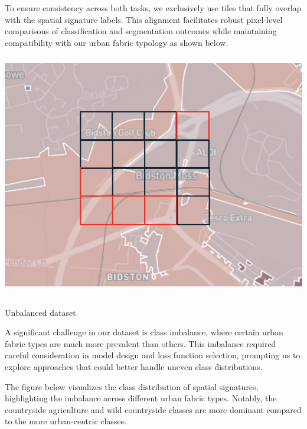 \documentclass[
  letterpaper,
  DIV=11,
  numbers=noendperiod]{scrartcl}
\makeatletter
\let\oldparagraph\paragraph
\renewcommand{\paragraph}{
    \@ifstar
      \xxxParagraphStar
      \xxxParagraphNoStar
  }
\newcommand{\xxxParagraphStar}[1]{\oldparagraph*{#1}\mbox{}}
\newcommand{\xxxParagraphNoStar}[1]{\oldparagraph{#1}\mbox{}}
\makeatother
\begin{document}
To ensure consistency across both tasks, we exclusively use tiles that
fully overlap with the spatial signature labels. This alignment
facilitates robust pixel-level comparisons of classification and
segmentation outcomes while maintaining compatibility with our urban
fabric typology as shown below.

\includegraphics[width=\linewidth,height=4.16667in,keepaspectratio]{../figures/algo_design/sampling.png}\hfill

\paragraph{Unbalanced dataset}\label{unbalanced-dataset}

A significant challenge in our dataset is class imbalance, where certain
urban fabric types are much more prevalent than others. This imbalance
required careful consideration in model design and loss function
selection, prompting us to explore approaches that could better handle
uneven class distributions.

The figure below visualizes the class distribution of spatial
signatures, highlighting the imbalance across different urban fabric
types. Notably, the countryside agriculture and wild countryside classes
are more dominant compared to the more urban-centric classes.
\end{document}
